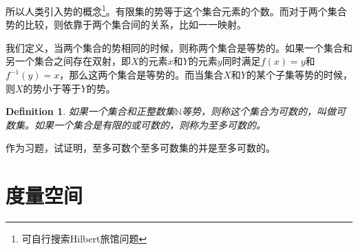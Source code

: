 \documentclass[11pt,a4paper,openany]{book}%
\theoremstyle{plain}%
\newtheorem{defi}{Definition}[chapter]%
\begin{document}
所以人类引入势的概念\footnote{可自行搜索Hilbert旅馆问题}。有限集的势等于这个集合元素的个数。而对于两个集合势的比较，则依靠于两个集合间的关系，比如一一映射。

我们定义，当两个集合的势相同的时候，则称两个集合是等势的。如果一个集合和另一个集合之间存在双射，即$X$的元素$x$和$Y$的元素$y$同时满足$f(x)=y$和$f^{-1}(y)=x$，那么这两个集合是等势的。而当集合$X$和$Y$的某个子集等势的时候，则$X$的势小于等于$Y$的势。
\begin{defi}
如果一个集合和正整数集$\mathbb{N}$等势，则称这个集合为可数的，叫做可数集。如果一个集合是有限的或可数的，则称为至多可数的。
\end{defi}
作为习题，试证明，至多可数个至多可数集的并是至多可数的。
\section{度量空间}
\end{document}
